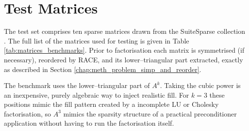 \section{Test Matrices}
\label{sec:res_matrices}
The test set comprises ten sparse matrices drawn from the SuiteSparse
collection \cite{10.1145/2049662.2049663}. The full list of the matrices used for testing is given in Table \ref{tab:matrices_benchmarks}.
Prior to factorisation each matrix is symmetrised (if necessary),
reordered by RACE, and its lower–triangular part extracted, exactly as described in Section \ref{chap:meth_problem_simp_and_reorder}.  

The benchmark uses the lower–triangular part of $A^{k}$.
Taking the cubic power is an inexpensive, purely algebraic way to inject realistic fill. For $k=3$ these positions mimic the fill pattern created by a
incomplete LU or Cholesky factorisation, so
$A^3$ mimics the sparsity structure of a
practical preconditioner application without having to run the factorisation itself. 

